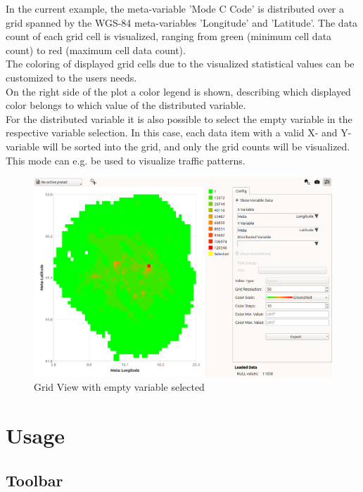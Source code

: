 In the current example, the meta-variable 'Mode C Code' is distributed over a grid spanned by the WGS-84 meta-variables 'Longitude' and 'Latitude'.
The data count of each grid cell is visualized, ranging from green (minimum cell data count) to red (maximum cell data count). \\

The coloring of displayed grid cells due to the visualized statistical values can be customized to the users needs. \\

On the right side of the plot a color legend is shown, describing which displayed color belongs to which value of the distributed variable. \\

For the distributed variable it is also possible to select the empty variable in the respective variable selection. 
In this case, each data item with a valid X- and Y-variable will be sorted into the grid, 
and only the grid counts will be visualized. This mode can e.g. be used to visualize traffic patterns.

\begin{figure}[H]
  \hspace*{-2cm}
  \includegraphics[width=18cm,frame]{figures/grid_loaded_emptyvar.png}
\caption{Grid View with empty variable selected}
\end{figure}

\section{Usage}

\subsection{Toolbar}

